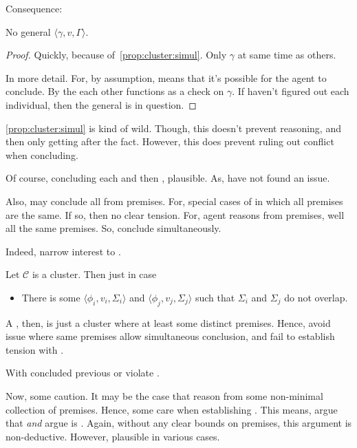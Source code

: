 \begin{note}[No \(\gamma\)]
  Consequence:

  \begin{proposition}
    \label{prop:cluster:no-general}
    No general \(\langle \gamma,v,\Gamma \rangle\).
    \begin{proof}
      Quickly, because of~\ref{prop:cluster:simul}.
      Only \(\gamma\) at same time as others.

      In more detail.
      For, by assumption, \requ{} means that it's possible for the agent to conclude.
      By the each other \requ{} functions as a check on \(\gamma\).
      If haven't figured out each individual, then the general is in question.
    \end{proof}
  \end{proposition}
\end{note}

\begin{note}
  \autoref{prop:cluster:simul} is kind of wild.
  Though, this doesn't prevent reasoning, and then only getting \csN{} after the fact.
  However, this does prevent ruling out conflict when concluding.

  Of course, concluding each and then \csVImp{}, plausible.
  As, have not found an issue.

  Also, may conclude all from premises.
  For, special cases of \cluster{} in which all premises are the same.
  If so, then no clear tension.
  For, agent reasons from premises, well all the same premises.
  So, conclude simultaneously.
\end{note}

\begin{note}
  Indeed, narrow interest to .

  \begin{definition}[\ragCluster{3}]
    Let \(\mathcal{C}\) is a cluster.
    Then \emph{\ragCluster{}} just in case
    \begin{itemize}
    \item
      There is some \(\langle \phi_{i},v_{i},\Sigma_{i} \rangle\) and \(\langle \phi_{j},v_{j},\Sigma_{j} \rangle\) such that \(\Sigma_{i}\) and \(\Sigma_{j}\) do not overlap.
    \end{itemize}
  \end{definition}

  A \ragCluster{}, then, is just a cluster where at least some distinct premises.
  Hence, avoid issue where same premises allow simultaneous conclusion, and fail to establish tension with \ESU{}.

  \begin{proposition}
    With \ragCluster{} concluded previous or violate \ESU{}.
  \end{proposition}

  Now, some caution.
  It may be the case that reason from some non-minimal collection of premises.
  Hence, some care when establishing \ragged{}.
  This means, argue that \cluster{} \emph{and} argue \cluster{} is \ragged{}.
  Again, without any clear bounds on premises, this argument is non-deductive.
  However, plausible in various cases.
\end{note}

